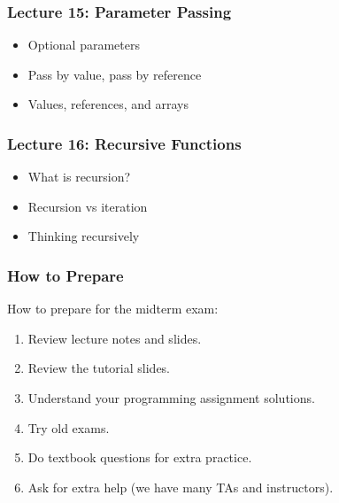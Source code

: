 \begin{frame}
\frametitle{Lecture 15: Parameter Passing}

{\Large
\begin{itemize}
	\item Optional parameters
	\item Pass by value, pass by reference
	\item Values, references, and  arrays	
\end{itemize}
}

\end{frame}


\begin{frame}
\frametitle{Lecture 16: Recursive Functions}

{\Large
\begin{itemize}
	\item What is recursion?
	\item Recursion vs iteration
	\item Thinking recursively
	
\end{itemize}
}

\end{frame}



\begin{frame}
\frametitle{How to Prepare}

How to prepare for the midterm exam:

\begin{enumerate}
	\item Review lecture notes and slides.
	\item Review the tutorial slides.
	\item Understand your programming assignment solutions.
	\item Try old exams.
	\item Do textbook questions for extra practice.
	\item Ask for extra help (we have many TAs and instructors).
\end{enumerate}

\end{frame}

